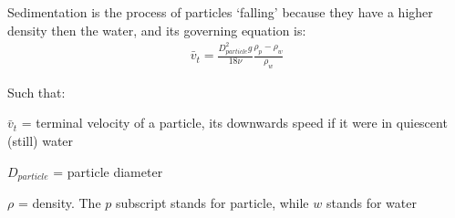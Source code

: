 \documentclass[letterpaper,10pt,english]{sphinxmanual}
\begin{document}
Sedimentation is the process of particles ‘falling’ because they have a higher density then the water, and its governing equation is:
\begin{equation}\label{equation:Introduction/Introduction:eq_laminar_terminal_velocity}
\begin{split} \bar v_t = \frac{D_{particle}^2 g}{18 \nu} \frac{\rho_p - \rho_w}{\rho_w}\end{split}
\end{equation}
\begin{DUlineblock}{0em}
\item[] Such that:
\item[] \(\bar v_t\) = terminal velocity of a particle, its downwards speed if it were in quiescent (still) water
\item[] \(D_{particle}\) = particle diameter
\item[] \(\rho\) = density. The \(p\) subscript stands for particle, while \(w\) stands for water
\end{DUlineblock}
\end{document}
